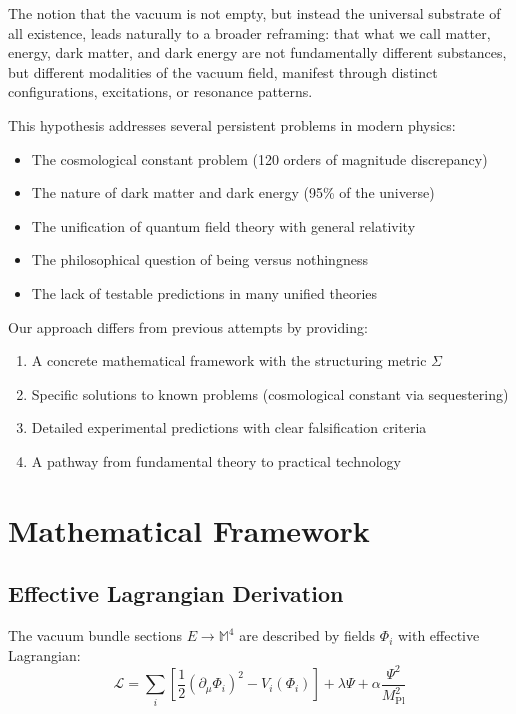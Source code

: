 \documentclass[12pt,a4paper]{article}
\newcommand{\structuring}{\Sigma}
\newcommand{\planck}{M_{\text{Pl}}}
\newcommand{\sequester}{\Psi}
\begin{document}
The notion that the vacuum is not empty, but instead the universal substrate of all existence, leads naturally to a broader reframing: that what we call matter, energy, dark matter, and dark energy are not fundamentally different substances, but different modalities of the vacuum field, manifest through distinct configurations, excitations, or resonance patterns.

This hypothesis addresses several persistent problems in modern physics:
\begin{itemize}
\item The cosmological constant problem (120 orders of magnitude discrepancy)
\item The nature of dark matter and dark energy (95\% of the universe)
\item The unification of quantum field theory with general relativity
\item The philosophical question of being versus nothingness
\item The lack of testable predictions in many unified theories
\end{itemize}

Our approach differs from previous attempts by providing:
\begin{enumerate}
\item A concrete mathematical framework with the structuring metric $\structuring$
\item Specific solutions to known problems (cosmological constant via sequestering)
\item Detailed experimental predictions with clear falsification criteria
\item A pathway from fundamental theory to practical technology
\end{enumerate}

\section{Mathematical Framework}

\subsection{Effective Lagrangian Derivation}

The vacuum bundle sections $E \rightarrow \mathbb{M}^4$ are described by fields $\Phi_i$ with effective Lagrangian:
\begin{equation}
\mathcal{L} = \sum_i\left[\frac{1}{2}(\partial_\mu\Phi_i)^2 - V_i(\Phi_i)\right] + \lambda \sequester + \alpha\frac{\sequester^2}{\planck^2}
\label{eq:lagrangian}
\end{equation}
\end{document}
